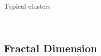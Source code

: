 \documentclass{beamer}
\begin{document}
\begin{frame}{Typical clusters}
	
	\begin{figure}[H]
		\centering
		\\
	\end{figure}
	
\end{frame}

\subsection{Fractal Dimension}
\end{document}
